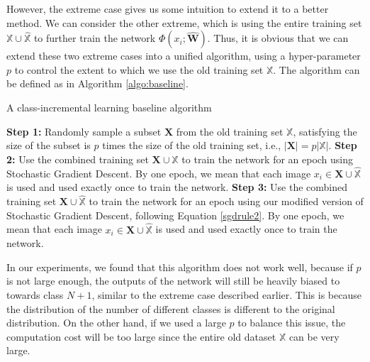 However, the extreme case gives us some intuition to extend it to a better method. We can consider the other extreme, which is using the entire training set $\mathbb{X}\cup \hat{\mathbb{X}}$ to further train the network $\Phi(x_i; \hat{\mathbf{W}})$. Thus, it is obvious that we can extend these two extreme cases into a unified algorithm, using a hyper-parameter $p$ to control the extent to which we use the old training set $\mathbb{X}$. The algorithm can be defined as in Algorithm \ref{algo:baseline}.


\begin{algorithm}
	\caption{A class-incremental learning baseline algorithm}
	\label{algo:baseline}
	\begin{algorithmic}
		\State \textbf{Step 1:} Randomly sample a subset $\mathbf{X}$ from the old training set $\mathbb{X}$, satisfying the size of the subset is $p$ times the size of the old training set, i.e., $|\mathbf{X}| = p|\mathbb{X}|$.
		\State \textbf{Step 2:} Use the combined training set $\mathbf{X} \cup \hat{\mathbb{X}}$ to train the network for an epoch using Stochastic Gradient Descent. By one epoch, we mean that each image $x_i \in \mathbf{X} \cup \hat{\mathbb{X}}$ is used and used exactly once to train the network.
		\State \textbf{Step 3:} Use the combined training set $\mathbf{X} \cup \hat{\mathbb{X}}$ to train the network for an epoch using our modified version of Stochastic Gradient Descent, following Equation \ref{sgdrule2}. By one epoch, we mean that each image $x_i \in \mathbf{X} \cup \hat{\mathbb{X}}$ is used and used exactly once to train the network.
		\EndFor
	\end{algorithmic}
\end{algorithm}

In our experiments, we found that this algorithm does not work well, because if $p$ is not large enough, the outputs of the network will still be heavily biased to towards class $N+1$, similar to the extreme case described earlier. This is because the distribution of the number of different classes is different to the original distribution. On the other hand, if we used a large $p$ to balance this issue, the computation cost will be too large since the entire old dataset $\mathbb{X}$ can be very large.

